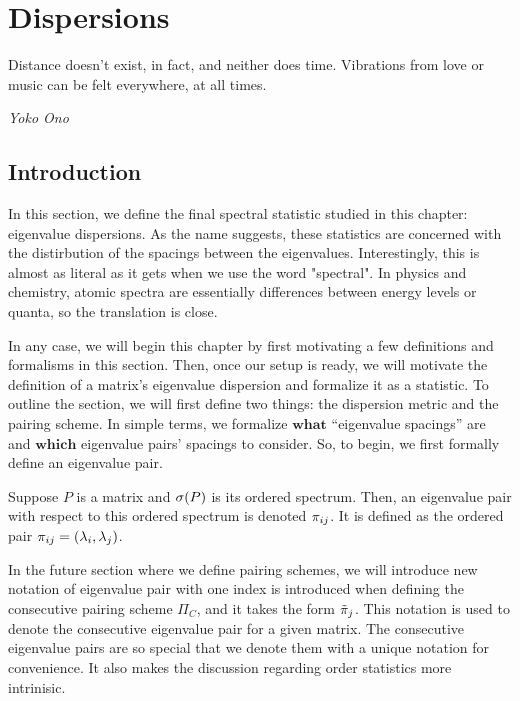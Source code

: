 
\chapter{Dispersions}

\epigraph{Distance doesn't exist, in fact, and neither does time. Vibrations from love or music can be felt everywhere, at all times.}{\textit{Yoko Ono}}

\section{Introduction}

In this section, we define the final spectral statistic studied in this chapter: eigenvalue dispersions. As the name suggests, these statistics are concerned with the distirbution of the spacings between the eigenvalues. Interestingly, this is almost as literal as it gets when we use the word "spectral". In physics and chemistry, atomic spectra are essentially differences between energy levels or quanta, so the translation is close.

In any case, we will begin this chapter by first motivating a few definitions and formalisms in this section. Then, once our setup is ready, we will motivate the definition of a matrix's eigenvalue dispersion and formalize it as a statistic. To outline the section, we will first define two things: the dispersion metric and the pairing scheme. In simple terms, we formalize $\textbf{what}$ ``eigenvalue spacings'' are and $\textbf{which}$ eigenvalue pairs' spacings to consider. So, to begin, we first formally define an eigenvalue pair.

\begin{definition}
  Suppose $P$ is a matrix and $\sigma(P)$ is its ordered spectrum. Then, an eigenvalue pair with respect to this ordered spectrum is denoted ${\pi_{ij}}$. It is defined as the ordered pair ${\pi_{ij}} = (\lambda_i, \lambda_j)$.
\end{definition}


In the future section where we define pairing schemes, we will introduce new notation of eigenvalue pair with one index is introduced when defining the consecutive pairing scheme $\Pi_C$, and it takes the form ${\tilde{\pi}}_j$. This notation is used to denote the consecutive eigenvalue pair for a given matrix. The consecutive eigenvalue pairs are so special that we denote them with a unique notation for convenience. It also makes the discussion regarding order statistics more intrinisic.

